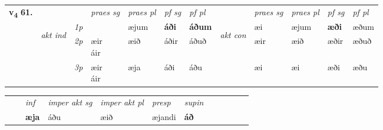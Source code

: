 \begin{tabular}{llllllllllll} \toprule
\multirow{4}{*}{{{\textbf{v{\textsubscript{4}}} \Large{\textbf{61.}}}}}  & &   &  \textit{praes sg}  & \textit{praes pl}  &\textit{ pf sg} & \textit{pf pl} &  &  \textit{praes sg}  & \textit{praes pl}  & \textit{pf sg} & \textit{pf pl } \\*
	\cmidrule{4-7} \cmidrule{9-12}
 & \multirow{3}{*}{\begin{turn}{90}\textit{akt ind}\end{turn}} & {\textit{1p}} & \textbf{\specialcell{æi\\ ái}} & æjum    & \textbf{áði} & \textbf{áðum} & \multirow{3}{*}{\begin{turn}{90}\textit{akt con}\end{turn}} &æi & æjum & \textbf{æði} & æðum\\*
& &  {\textit{2p}} &  \specialcell{æir\\ áir}  & æið   & áðir & áðuð & & æir & æið & æðir & æðuð \\*
& &  {\textit{3p}} & \specialcell{æir\\ áir} & æja   & áði & áðu & & æi & æi& æði & æðu  \\*
\cmidrule{4-7} \cmidrule{9-12}
\end{tabular}


\begin{tabular}{llllllllllll}
 & & \textit{inf} & \textit{imper akt sg} & \textit{imper akt pl}   & \textit{presp} & \textit{supin}       \\*
  & & \textbf{æja} & áðu  & æið   & æjandi &  \textbf{áð}   \\*
\cmidrule{1-12}
\end{tabular}



